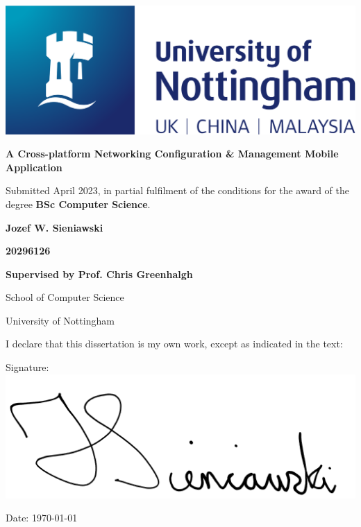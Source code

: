 \documentclass [11pt,a4paper]{article}
\begin{document}
 
\thispagestyle{empty}
\begin{center}
    \centering
    \includegraphics[width=0.5\linewidth]{images/nottingham-logo.png}
    \vspace{2.5cm}
    {\Large \par}
    {\LARGE \textbf{A Cross-platform Networking Configuration \& Management Mobile Application}\par}
    \vspace{1.5cm}
    {\small Submitted April 2023, in partial fulfilment of \break the conditions for the award of the degree \textbf{BSc Computer Science}.\par}
    \vspace{1cm}
    {\Large \textbf{Jozef W. Sieniawski}\par}
    {\textbf{20296126}\par}
    \vspace{1cm}
    {\normalsize \textbf{Supervised by Prof. Chris Greenhalgh}\par}
    \vspace{1cm}
    {\normalsize School of Computer Science\par}
    {\normalsize University of Nottingham\par}
    \vspace{2cm}
    {\normalsize I declare that this dissertation is my own work, except as indicated in the text:\par}
    \vspace{1cm}
    {\normalsize Signature: \underline{ \includegraphics[width=0.25\linewidth]{images/signature.png}}\par}
    \vspace{0.25cm}
    {\normalsize Date: \today\par}
\end{center}

\pagebreak
{}
\pagebreak
\end{document}
